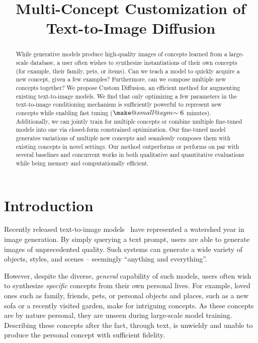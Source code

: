 \title{Multi-Concept Customization of Text-to-Image Diffusion}

\begin{abstract}
While generative models produce high-quality images of concepts learned from a large-scale database, a user often wishes to synthesize instantiations of their own concepts (for example, their family, pets, or items). Can we teach a model to quickly acquire a new concept, given a few examples? Furthermore, can we compose multiple new concepts together? We propose Custom Diffusion, an efficient method for augmenting existing text-to-image models. We find that only optimizing a few parameters in the text-to-image conditioning mechanism is sufficiently powerful to represent new concepts while enabling fast tuning ($\mathrel{\mathpalette\make@small@sym{\sim}}6$ minutes). Additionally, we can jointly train for multiple concepts or combine multiple fine-tuned models into one via closed-form constrained optimization. Our fine-tuned model generates variations of multiple new concepts and seamlessly composes them with existing concepts in novel settings. Our method outperforms or performs on par with several baselines and concurrent works in both qualitative and quantitative evaluations while being memory and computationally efficient.
\end{abstract}

\section{Introduction}
\label{sec:intro}

Recently released text-to-image models~\cite{ramesh2022hierarchical,saharia2022photorealistic,rombach2022high,yu2022scaling} have represented a watershed year in image generation. By simply querying a text prompt, users are able to generate images of unprecedented quality. Such systems can generate a wide variety of objects, styles, and scenes -- seemingly ``anything and everything''.

However, despite the diverse, \textit{general} capability of such models, users often wish to synthesize \textit{specific} concepts from their own personal lives. For example, loved ones such as family, friends, pets, or personal objects and places, such as a new sofa or a recently visited garden, make for intriguing concepts. As these concepts are by nature personal, they are unseen during large-scale model training. Describing these concepts after the fact, through text, is unwieldy and unable to produce the personal concept with sufficient fidelity. 

